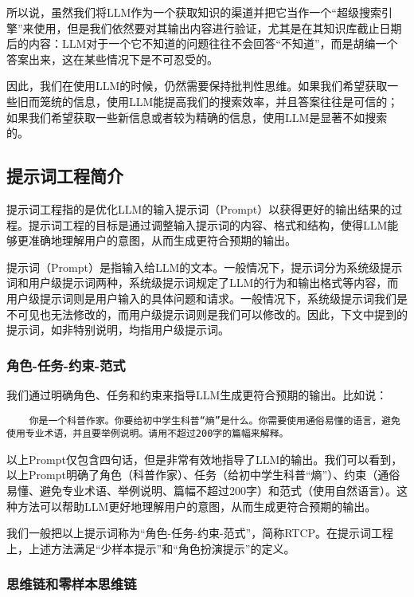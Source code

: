 \documentclass[../main.tex]{subfiles}
\begin{document}
所以说，虽然我们将LLM作为一个获取知识的渠道并把它当作一个“超级搜索引擎”来使用，但是我们依然要对其输出内容进行验证，尤其是在其知识库截止日期后的内容：LLM对于一个它不知道的问题往往不会回答“不知道”，而是胡编一个答案出来，这在某些情况下是不可忍受的。

因此，我们在使用LLM的时候，仍然需要保持批判性思维。如果我们希望获取一些旧而笼统的信息，使用LLM能提高我们的搜索效率，并且答案往往是可信的；如果我们希望获取一些新信息或者较为精确的信息，使用LLM是显著不如搜索的。

\subsection{提示词工程简介}

提示词工程指的是优化LLM的输入提示词（Prompt）以获得更好的输出结果的过程。提示词工程的目标是通过调整输入提示词的内容、格式和结构，使得LLM能够更准确地理解用户的意图，从而生成更符合预期的输出。

提示词（Prompt）是指输入给LLM的文本。一般情况下，提示词分为系统级提示词和用户级提示词两种，系统级提示词规定了LLM的行为和输出格式等内容，而用户级提示词则是用户输入的具体问题和请求。一般情况下，系统级提示词我们是不可见也无法修改的，而用户级提示词则是我们可以修改的。因此，下文中提到的提示词，如非特别说明，均指用户级提示词。

\subsubsection{角色-任务-约束-范式}

我们通过明确角色、任务和约束来指导LLM生成更符合预期的输出。比如说：

\begin{lstlisting}
    你是一个科普作家。你要给初中学生科普“熵”是什么。你需要使用通俗易懂的语言，避免使用专业术语，并且要举例说明。请用不超过200字的篇幅来解释。
\end{lstlisting}

以上Prompt仅包含四句话，但是非常有效地指导了LLM的输出。我们可以看到，以上Prompt明确了角色（科普作家）、任务（给初中学生科普“熵”）、约束（通俗易懂、避免专业术语、举例说明、篇幅不超过200字）和范式（使用自然语言）。这种方法可以帮助LLM更好地理解用户的意图，从而生成更符合预期的输出。

我们一般把以上提示词称为“角色-任务-约束-范式”，简称RTCP。在提示词工程上，上述方法满足“少样本提示”和“角色扮演提示”的定义。

\subsubsection{思维链和零样本思维链}
\end{document}
